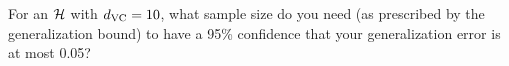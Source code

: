 \begin{enunciado}{12}
    For an $\mathcal{H}$ with $d_{\text{VC}} = 10$, what sample size
    do you need (as prescribed by the generalization bound) to have a 95\% confidence that your generalization error is at most 0.05?
\end{enunciado}

